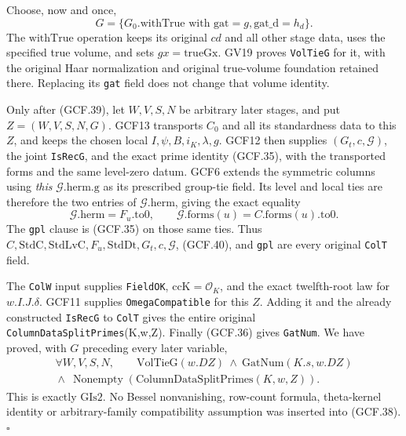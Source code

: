 \documentclass[11pt,a4paper]{article}
\numberwithin{equation}{section}
\theoremstyle{remark}\newtheorem{remark}[theorem]{Remark}
\begin{document}
Choose, now and once,
\[
         G=\{G_0.\mathrm{withTrue}
                        \text{ with }\mathrm{gat}=g,
                                      \mathrm{gat\_\allowbreak d}=h_d\}.
 \tag{GCF.39}
\]
The \(\mathrm{withTrue}\) operation keeps its original \(cd\)
and all other stage data, uses the specified true volume, and sets
\(gx=\mathrm{trueGx}\).  GV19 proves \texttt{Vol\allowbreak Tie\allowbreak G} for it,
with the original Haar normalization and original true-volume
foundation retained there.  Replacing its \texttt{gat} field does
not change that volume identity.

Only after (GCF.39), let \(W,V,S,N\) be arbitrary later stages,
and put \(Z=(W,V,S,N,G)\).  GCF13 transports \(C_0\) and all its
standardness data to this \(Z\), and keeps the chosen local
\(I,\psi,B,i_K,\lambda,g\).  GCF12 then supplies
\((G_t,c,\mathcal G)\), the joint \texttt{Is\allowbreak Rec\allowbreak G}, and the exact
prime identity (GCF.35), with the transported forms and the same
level-zero datum.  GCF6 extends the symmetric columns using
\emph{this} \(\mathcal G.\mathrm{herm.g}\) as its prescribed
group-tie field.  Its level and local ties are therefore the two
entries of \(\mathcal G.\mathrm{herm}\), giving the exact equality
\[
 \mathcal G.\mathrm{herm}=F_u.\mathrm{to0},\qquad
 \mathcal G.\mathrm{forms}(u)=C.\mathrm{forms}(u).\mathrm{to0}.
 \tag{GCF.40}
\]
The \texttt{gpl} clause is (GCF.35) on those same ties.  Thus
\(C,\mathrm{StdC},\mathrm{StdLvC},F_u,\mathrm{StdDt},G_t,c,
\mathcal G\), (GCF.40), and \texttt{gpl} are every original
\texttt{Col\allowbreak T} field.

The \texttt{Col\allowbreak W} input supplies \texttt{Field\allowbreak OK},
\(\mathrm{ccK}=\mathcal O_K\), and the exact twelfth-root law for
\(w.I.J.\delta\).  GCF11 supplies \texttt{Omega\allowbreak Compatible} for
this \(Z\).  Adding it and the already constructed \texttt{Is\allowbreak Rec\allowbreak G}
to \texttt{Col\allowbreak T} gives the entire original
\texttt{Column\allowbreak Data\allowbreak Split\allowbreak Primes}(K,w,Z).  Finally (GCF.36) gives
\texttt{Gat\allowbreak Num}.  We have proved, with \(G\) preceding every
later variable,
\[
 \begin{gathered}
 \forall W,V,S,N,\qquad
       \mathrm{VolTieG}(w.DZ)\ \land\ \mathrm{GatNum}(K.s,w.DZ)\\
       {}\land\ \operatorname{Nonempty}
                  (\mathrm{ColumnDataSplitPrimes}(K,w,Z)).
 \end{gathered}                                                   \tag{GCF.41}
\]
This is exactly \(\mathrm{GIs2}\).  No Bessel nonvanishing,
row-count formula, theta-kernel identity or arbitrary-family
compatibility assumption was inserted into (GCF.38).
\hfill\(\square\)
\end{document}
